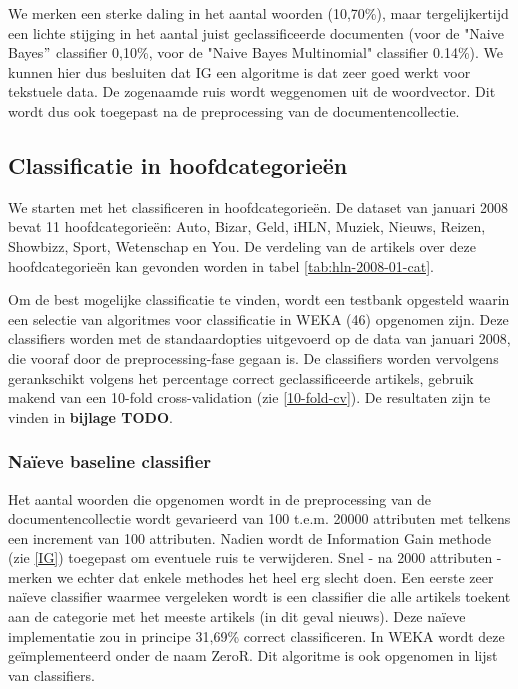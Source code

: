 We merken een sterke daling in het aantal woorden (10,70\%), maar tergelijkertijd een lichte stijging in het aantal juist geclassificeerde documenten (voor de "Naive Bayes$"$ classifier 0,10\%, voor de "Naive Bayes Multinomial" classifier 0.14\%).  We kunnen hier dus besluiten dat IG een algoritme is dat zeer goed werkt voor tekstuele data. De zogenaamde ruis wordt weggenomen uit de woordvector. Dit wordt dus ook toegepast na de preprocessing van de documentencollectie.


\subsection{Classificatie in hoofdcategorie\"en}
We starten met het classificeren in hoofdcategorie\"en. De dataset van januari 2008 bevat 11 hoofdcategorie\"en: Auto, Bizar, Geld, iHLN, Muziek, Nieuws, Reizen, Showbizz, Sport, Wetenschap en You. De verdeling van de artikels over deze hoofdcategorie\"en kan gevonden worden in tabel \ref{tab:hln-2008-01-cat}.

Om de best mogelijke classificatie te vinden, wordt een testbank opgesteld waarin een selectie van algoritmes voor classificatie in WEKA (46) opgenomen zijn. Deze classifiers worden met de standaardopties uitgevoerd op de data van januari 2008, die vooraf door de preprocessing-fase gegaan is. De classifiers worden vervolgens gerankschikt volgens het percentage correct geclassificeerde artikels, gebruik makend van een 10-fold cross-validation (zie \ref{10-fold-cv}). De resultaten zijn te vinden in \textbf{bijlage TODO}.

\subsubsection{Na\"ieve baseline classifier}\label{naieve-classifier}
Het aantal woorden die opgenomen wordt in de preprocessing van de documentencollectie wordt gevarieerd van 100 t.e.m. 20000 attributen met telkens een increment van 100 attributen. Nadien wordt de Information Gain methode (zie \ref{IG}) toegepast om eventuele ruis te verwijderen. Snel - na 2000 attributen - merken we echter dat enkele methodes het heel erg slecht doen. Een eerste zeer na\"ieve classifier waarmee vergeleken wordt is een classifier die alle artikels toekent aan de categorie met het meeste artikels (in dit geval nieuws). Deze na\"ieve implementatie zou in principe 31,69\% correct classificeren. In WEKA wordt deze ge\"implementeerd onder de naam ZeroR. Dit algoritme is ook opgenomen in lijst van classifiers. 


